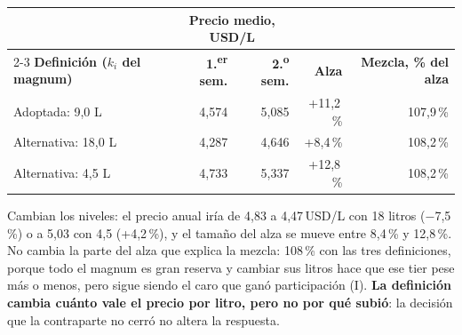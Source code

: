 \begin{center}
\small
\renewcommand{\arraystretch}{1.15}
\begin{tabular}{@{}l r r r r@{}}
\toprule
& \multicolumn{2}{c}{\textbf{Precio medio, USD/L}} & & \\
\cmidrule(lr){2-3}
\textbf{Definición ($k_i$ del magnum)} & \textbf{1.\textsuperscript{er} sem.} & \textbf{2.\textsuperscript{o} sem.} & \textbf{Alza} & \textbf{Mezcla, \% del alza} \\
\midrule
Adoptada: 9,0 L & 4,574 & 5,085 & +11,2\,\% & 107,9\,\% \\
Alternativa: 18,0 L & 4,287 & 4,646 & +8,4\,\% & 108,2\,\% \\
Alternativa: 4,5 L & 4,733 & 5,337 & +12,8\,\% & 108,2\,\% \\
\bottomrule
\end{tabular}
\end{center}

\noindent Cambian los niveles: el precio anual iría de 4,83 a 4,47\,USD/L con 18 litros ($-$7,5\,\%) o a 5,03 con 4,5 (+4,2\,\%), y el tamaño del alza se mueve entre 8,4\,\% y 12,8\,\%. No cambia la parte del alza que explica la mezcla: 108\,\% con las tres definiciones, porque todo el magnum es gran reserva y cambiar sus litros hace que ese tier pese más o menos, pero sigue siendo el caro que ganó participación (I). \textbf{La definición cambia cuánto vale el precio por litro, pero no por qué subió}: la decisión que la contraparte no cerró no altera la respuesta.

